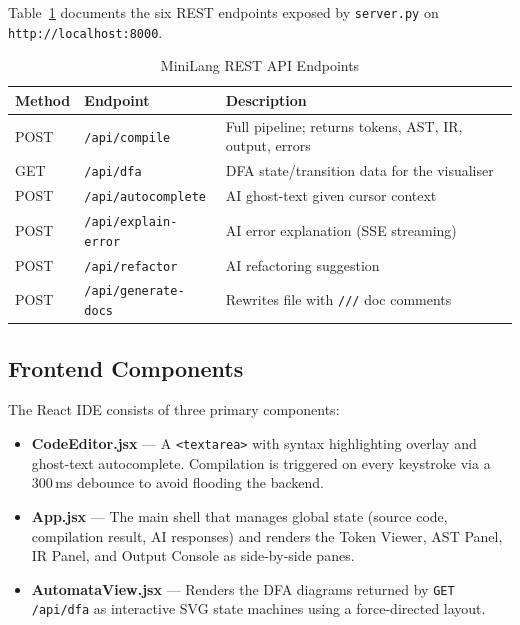 \documentclass[conference]{IEEEtran}
\begin{document}
Table~\ref{tab:api} documents the six REST endpoints exposed by
\texttt{server.py} on \texttt{http://localhost:8000}.

\begin{table}[htbp]
\caption{MiniLang REST API Endpoints}
\label{tab:api}
\centering
\renewcommand{\arraystretch}{1.2}
\begin{tabular}{@{}p{0.9cm}p{2.6cm}p{4.2cm}@{}}
\toprule
\textbf{Method} & \textbf{Endpoint} & \textbf{Description} \\
\midrule
POST & \texttt{/api/compile}         & Full pipeline; returns tokens, AST, IR, output, errors \\
GET  & \texttt{/api/dfa}             & DFA state/transition data for the visualiser \\
POST & \texttt{/api/autocomplete}    & AI ghost-text given cursor context \\
POST & \texttt{/api/explain-error}   & AI error explanation (SSE streaming) \\
POST & \texttt{/api/refactor}        & AI refactoring suggestion \\
POST & \texttt{/api/generate-docs}   & Rewrites file with \texttt{///} doc comments \\
\bottomrule
\end{tabular}
\end{table}

\subsection{Frontend Components}

The React IDE consists of three primary components:

\begin{itemize}
  \item \textbf{CodeEditor.jsx} --- A \texttt{<textarea>} with syntax
        highlighting overlay and ghost-text autocomplete. Compilation
        is triggered on every keystroke via a 300\,ms debounce to avoid
        flooding the backend.
  \item \textbf{App.jsx} --- The main shell that manages global state
        (source code, compilation result, AI responses) and renders
        the Token Viewer, AST Panel, IR Panel, and Output Console as
        side-by-side panes.
  \item \textbf{AutomataView.jsx} --- Renders the DFA diagrams returned
        by \texttt{GET /api/dfa} as interactive SVG state machines
        using a force-directed layout.
\end{itemize}
\end{document}
